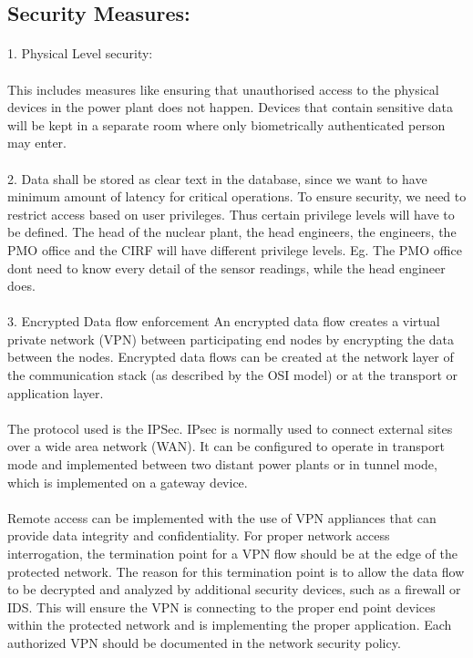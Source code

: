 \documentclass{article}
\begin{document}
\subsection{Security Measures:}
\paragraph{}
1. Physical Level security:\paragraph{}
This includes measures like ensuring that unauthorised access to the physical devices in the power plant does not happen. 
Devices that contain sensitive data will be kept in a separate room where only biometrically authenticated person may enter.
\paragraph{}
2. Data shall be stored as clear text in the database, since we want to have minimum amount of latency for critical operations. To ensure security, we need to restrict access based on user privileges. Thus certain privilege levels will have to be defined. The head of the nuclear plant, the head engineers, the engineers, the PMO office and the CIRF will have different privilege levels. Eg. The PMO office dont need to know every detail of the sensor readings, while the head engineer does.
\paragraph{}
3. Encrypted Data flow enforcement
An encrypted data flow creates a virtual private network (VPN) between participating end nodes
by encrypting the data between the nodes. 
Encrypted data flows can be created at the network layer of the communication stack (as
described by the OSI model) or at the transport or application layer.\paragraph{}
The protocol used is the IPSec.
 IPsec is normally used to connect external sites over a wide area network (WAN). It can be configured to operate in transport mode and implemented between two distant power plants or in tunnel mode, which is implemented on a gateway device. \paragraph{}
Remote access can be implemented with the use of VPN appliances that can provide data integrity and confidentiality. For proper network access interrogation, the termination point for a VPN flow
should be at the edge of the protected network. The reason for this termination point is
to allow the data flow to be decrypted and analyzed by additional security devices, such as a
firewall or IDS. This will ensure the VPN is connecting to the proper end point devices within
the protected network and is implementing the proper application. Each authorized VPN should
be documented in the network security policy.
\end{document}
